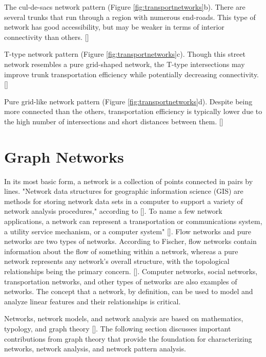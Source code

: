 The cul-de-sacs network pattern (Figure \ref{fig:transportnetworks}b). There are several trunks that run through a region with numerous end-roads. This type of network has good accessibility, but may be weaker in terms of interior connectivity than others. [\cite{Chan:2011,Lima:2015,Han:2020}]

T-type network pattern (Figure \ref{fig:transportnetworks}c). Though this street network resembles a pure grid-shaped network, the T-type intersections may improve trunk transportation efficiency while potentially decreasing connectivity. [\cite{Chan:2011,Lima:2015,Han:2020}]

Pure grid-like network pattern (Figure \ref{fig:transportnetworks}d). Despite being more connected than the others, transportation efficiency is typically lower due to the high number of intersections and short distances between them. [\cite{Chan:2011,Lima:2015,Han:2020}]

\section{Graph Networks}
In its most basic form, a network is a collection of points connected in pairs by lines. \cite{Newman:2010} "Network data structures for geographic information science (GIS) are methods for storing network data sets in a computer to support a variety of network analysis procedures," according to [\cite{Curtin:2008}]. To name a few network applications, a network can represent a transportation or communications system, a utility service mechanism, or a computer system" [\cite{Curtin:2008}]. Flow networks and pure networks are two types of networks. According to Fischer, flow networks contain information about the flow of something within a network, whereas a pure network represents any network's overall structure, with the topological relationships being the primary concern. [\cite{Ficsher:2003}]. Computer networks, social networks, transportation networks, and other types of networks are also examples of networks. The concept that a network, by definition, can be used to model and analyze linear features and their relationships is critical.

Networks, network models, and network analysis are based on mathematics, typology, and graph theory [\cite{Sovik:2014}]. The following section discusses important contributions from graph theory that provide the foundation for characterizing networks, network analysis, and network pattern analysis.

